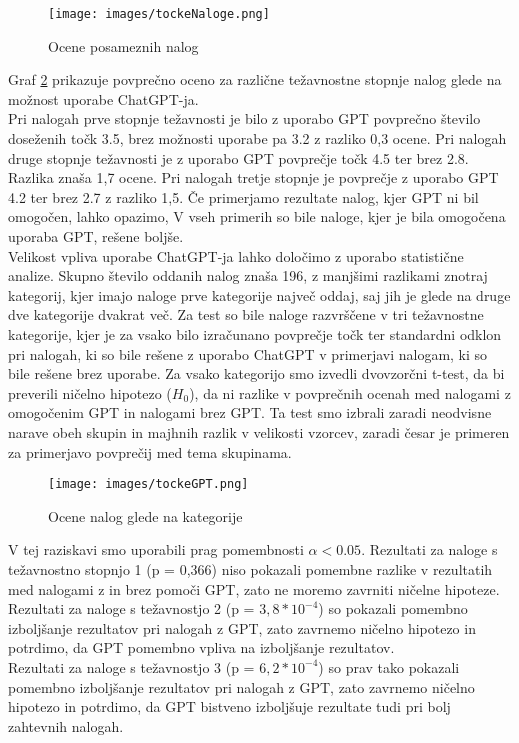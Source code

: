 \documentclass[a4paper,12pt,openright]{book}
\begin{document}
\begin{figure}[H]
    \centering
    \texttt{[image: images/tockeNaloge.png]}
    \caption{Ocene posameznih nalog}
    \label{fig:grade_all}
\end{figure}

Graf \ref{fig:bar_all} prikazuje povprečno oceno za različne težavnostne stopnje nalog glede na možnost uporabe ChatGPT-ja. \\
Pri nalogah prve stopnje težavnosti je bilo z uporabo GPT povprečno število doseženih točk 3.5, brez možnosti uporabe pa 3.2 z razliko 0,3 ocene. Pri nalogah druge stopnje težavnosti je z uporabo GPT povprečje točk 4.5 ter brez 2.8. Razlika znaša 1,7 ocene. Pri nalogah tretje stopnje je povprečje z uporabo GPT 4.2 ter brez 2.7 z razliko 1,5. Če primerjamo rezultate nalog, kjer GPT ni bil omogočen, lahko opazimo,   V vseh primerih so bile naloge, kjer je bila omogočena uporaba GPT, rešene boljše. \\
Velikost vpliva uporabe ChatGPT-ja lahko določimo z uporabo statistične analize.
Skupno število oddanih nalog znaša 196, z manjšimi razlikami znotraj kategorij, kjer imajo naloge prve kategorije največ oddaj, saj jih je glede na druge dve kategorije dvakrat več. Za test so bile naloge razvrščene v tri težavnostne kategorije, kjer je za vsako bilo izračunano povprečje točk ter standardni odklon pri nalogah, ki so bile rešene z uporabo ChatGPT v primerjavi nalogam, ki so bile rešene brez uporabe. Za vsako kategorijo smo izvedli dvovzorčni t-test, da bi preverili ničelno hipotezo ($H_0$), da ni razlike v povprečnih ocenah med nalogami z omogočenim GPT in nalogami brez GPT. Ta test smo izbrali zaradi neodvisne narave obeh skupin in majhnih razlik v velikosti vzorcev, zaradi česar je primeren za primerjavo povprečij med tema skupinama. 

\begin{figure}[H]
    \centering
    \texttt{[image: images/tockeGPT.png]}
    \caption{Ocene nalog glede na kategorije}
    \label{fig:bar_all}
\end{figure}
V tej raziskavi smo uporabili prag pomembnosti $\alpha < 0.05$.
 Rezultati za naloge s težavnostno stopnjo 1 (p = 0,366) niso pokazali pomembne razlike v rezultatih med nalogami z in brez pomoči GPT, zato ne moremo zavrniti ničelne hipoteze. \\
 Rezultati za naloge s težavnostjo 2 (p = $3,8 * 10^{-4}$) so pokazali pomembno izboljšanje rezultatov pri nalogah z GPT, zato zavrnemo ničelno hipotezo in potrdimo, da GPT pomembno vpliva na izboljšanje rezultatov. \\
 Rezultati za naloge s težavnostjo 3 (p = $6,2 * 10^{-4}$) so prav tako pokazali pomembno izboljšanje rezultatov pri nalogah z GPT, zato zavrnemo ničelno hipotezo in potrdimo, da GPT bistveno izboljšuje rezultate tudi pri bolj zahtevnih nalogah.\\
\end{document}
